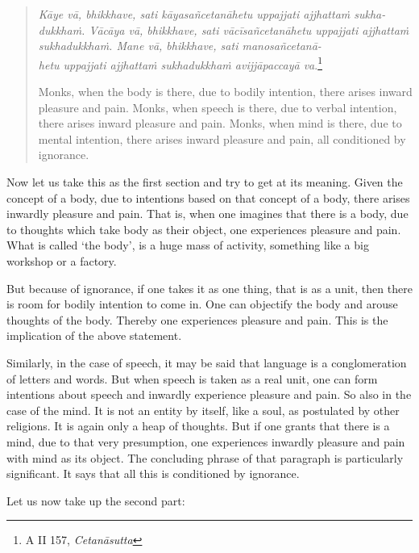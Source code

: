 \begin{quote}
\emph{Kāye vā, bhikkhave, sati kāyasañcetanāhetu uppajjati ajjhattaṁ sukha-\\ dukkhaṁ. Vācāya vā, bhikkhave, sati vācīsañcetanāhetu uppajjati ajjhattaṁ sukhadukkhaṁ. Mane vā, bhikkhave, sati manosañcetanā-\\ hetu uppajjati ajjhattaṁ sukhadukkhaṁ avijjāpaccayā va}.\footnote{A II 157, \emph{Cetanāsutta}}

Monks, when the body is there, due to bodily intention, there arises inward pleasure and pain. Monks, when speech is there, due to verbal intention, there arises inward pleasure and pain. Monks, when mind is there, due to mental intention, there arises inward pleasure and pain, all conditioned by ignorance.
\end{quote}

Now let us take this as the first section and try to get at its meaning. Given the concept of a body, due to intentions based on that concept of a body, there arises inwardly pleasure and pain. That is, when one imagines that there is a body, due to thoughts which take body as their object, one experiences pleasure and pain. What is called `the body', is a huge mass of activity, something like a big workshop or a factory.

But because of ignorance, if one takes it as one thing, that is as a unit, then there is room for bodily intention to come in. One can objectify the body and arouse thoughts of the body. Thereby one experiences pleasure and pain. This is the implication of the above statement.

Similarly, in the case of speech, it may be said that language is a conglomeration of letters and words. But when speech is taken as a real unit, one can form intentions about speech and inwardly experience pleasure and pain. So also in the case of the mind. It is not an entity by itself, like a soul, as postulated by other religions. It is again only a heap of thoughts. But if one grants that there is a mind, due to that very presumption, one experiences inwardly pleasure and pain with mind as its object. The concluding phrase of that paragraph is particularly significant. It says that all this is conditioned by ignorance.

Let us now take up the second part:

